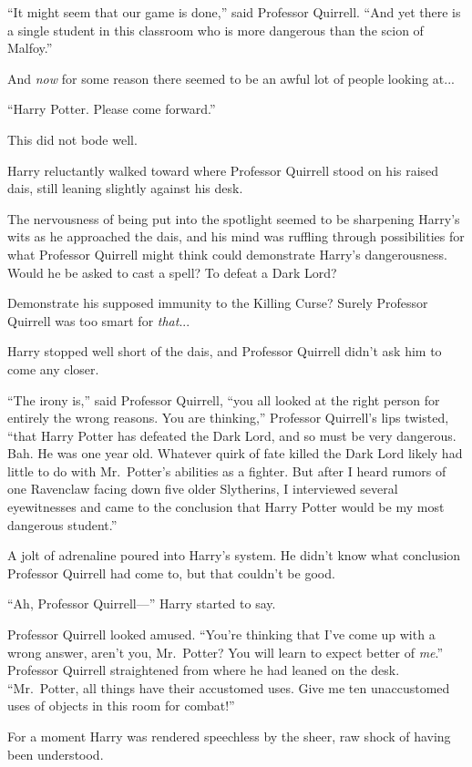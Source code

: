 “It might seem that our game is done,” said Professor Quirrell. “And yet there is a single student in this classroom who is more dangerous than the scion of Malfoy.”

And \emph{now} for some reason there seemed to be an awful lot of people looking at...

“Harry Potter. Please come forward.”

This did not bode well.

Harry reluctantly walked toward where Professor Quirrell stood on his raised dais, still leaning slightly against his desk.

The nervousness of being put into the spotlight seemed to be sharpening Harry’s wits as he approached the dais, and his mind was ruffling through possibilities for what Professor Quirrell might think could demonstrate Harry’s dangerousness. Would he be asked to cast a spell? To defeat a Dark Lord?

Demonstrate his supposed immunity to the Killing Curse? Surely Professor Quirrell was too smart for \emph{that}...

Harry stopped well short of the dais, and Professor Quirrell didn’t ask him to come any closer.

“The irony is,” said Professor Quirrell, “you all looked at the right person for entirely the wrong reasons. You are thinking,” Professor Quirrell’s lips twisted, “that Harry Potter has defeated the Dark Lord, and so must be very dangerous. Bah. He was one year old. Whatever quirk of fate killed the Dark Lord likely had little to do with Mr.~Potter’s abilities as a fighter. But after I heard rumors of one Ravenclaw facing down five older Slytherins, I interviewed several eyewitnesses and came to the conclusion that Harry Potter would be my most dangerous student.”

A jolt of adrenaline poured into Harry’s system. He didn’t know what conclusion Professor Quirrell had come to, but that couldn’t be good.

“Ah, Professor Quirrell—” Harry started to say.

Professor Quirrell looked amused. “You’re thinking that I’ve come up with a wrong answer, aren’t you, Mr.~Potter? You will learn to expect better of \emph{me}.” Professor Quirrell straightened from where he had leaned on the desk. “Mr.~Potter, all things have their accustomed uses. Give me ten unaccustomed uses of objects in this room for combat!”

For a moment Harry was rendered speechless by the sheer, raw shock of having been understood.

